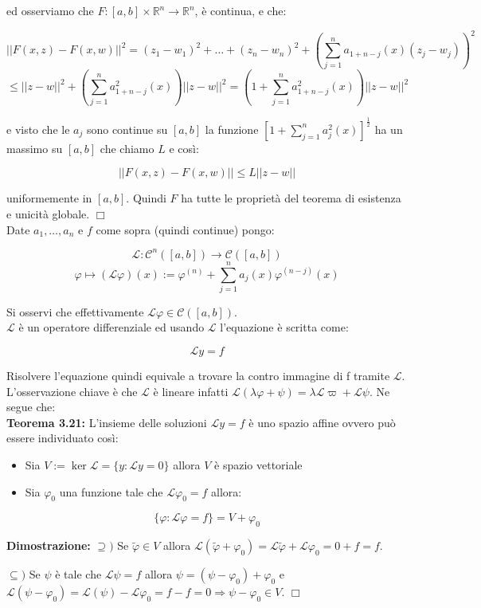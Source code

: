 \documentclass[a4paper,11pt,titlepage]{book}
\begin{document}
ed osserviamo che $F:[a,b]\times\mathbb{R}^n\to\mathbb{R}^n$, è continua, e che:

$$||F(x,z)-F(x,w)||^2=(z_1-w_1)^2+\ldots+(z_n-w_n)^2+\left( \sum_{j=1}^n a_{1+n-j}(x)(z_j-w_j)\right)^2$$ $$ \leq ||z-w||^2+\left( \sum_{j=1}^n a_{1+n-j}^2(x)\right)||z-w||^2=\left( 1+\sum_{j=1}^n a_{1+n-j}^2(x)\right)||z-w||^2$$

e visto che le $a_j$ sono continue su $[a,b]$ la funzione $[1+\sum_{j=1}^n a_j^2(x)]^\frac{1}{2}$ ha un massimo su $[a,b]$ che chiamo $L$ e così:

$$||F(x,z)-F(x,w)||\leq L||z-w||$$

uniformemente in $[a,b]$. Quindi $F$ ha tutte le proprietà del teorema di esistenza e unicità globale. $\Box$\\

Date $a_1,\ldots,a_n$ e $f$ come sopra (quindi continue) pongo:

$$\mathcal{L}:\mathcal{C}^n([a,b])\to\mathcal{C}([a,b])$$
$$\varphi\mapsto(\mathcal{L}\varphi)(x):=\varphi^{(n)}+\sum_{j=1}^n a_j(x)\varphi^{(n-j)}(x)$$

Si osservi che effettivamente $\mathcal{L}\varphi\in\mathcal{C}([a,b])$.\\

$\mathcal{L}$ è un operatore differenziale ed usando $\mathcal{L}$ l'equazione è scritta come:

$$\mathcal{L}y=f$$

Risolvere l'equazione quindi equivale a trovare la contro immagine di f tramite $\mathcal{L}$. L'osservazione chiave è che $\mathcal{L}$ è lineare infatti $\mathcal{L}(\lambda\varphi+\psi)=\lambda\mathcal{L}\varpi+\mathcal{L}\psi$. Ne segue che:\\

\textbf{Teorema 3.21:} L'insieme delle soluzioni $\mathcal{L}y=f$ è uno spazio affine ovvero può essere individuato così:\begin{itemize}
\item Sia $V:=\ker\mathcal{L}=\{y:\mathcal{L}y=0\}$ allora $V$ è spazio vettoriale
\item Sia $\varphi_0$ una funzione tale che $\mathcal{L}\varphi_0=f$ allora:
\end{itemize}
$$\{\varphi:\mathcal{L}\varphi=f\}=V+\varphi_0$$

\textbf{Dimostrazione: }$\supseteq)$ Se $\tilde{\varphi}\in V$ allora $\mathcal{L}(\tilde{\varphi}+\varphi_0)=\mathcal{L}\tilde{\varphi}+\mathcal{L}\varphi_0=0+f=f$. 

$\subseteq)$ Se $\psi$ è tale che $\mathcal{L}\psi=f$ allora $\psi=(\psi-\varphi_0)+\varphi_0$ e $\mathcal{L}(\psi-\varphi_0)=\mathcal{L}(\psi)-\mathcal{L}\varphi_0=f-f=0\Rightarrow\psi-\varphi_0\in V$. $\Box$\\
\end{document}

